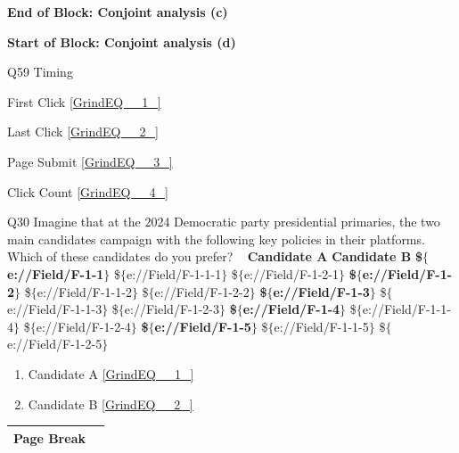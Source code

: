 \documentclass{article} %
\begin{document}
\noindent 

\noindent \textbf{End of Block: Conjoint analysis (c)}

\noindent \textbf{}

\noindent \textbf{Start of Block: Conjoint analysis (d)}

\noindent 

\noindent Q59 Timing

\noindent First Click  \eqref{GrindEQ__1_}

\noindent Last Click  \eqref{GrindEQ__2_}

\noindent Page Submit  \eqref{GrindEQ__3_}

\noindent Click Count  \eqref{GrindEQ__4_}

\noindent 

\noindent 

\noindent 

\noindent Q30 Imagine that at the 2024 Democratic party presidential primaries, the two main candidates campaign with the following key policies in their platforms. Which of these candidates do you prefer?       ~      \textbf{Candidate A}          \textbf{Candidate B}   \textbf{\$$\boldsymbol{\mathrm{\{}}$e://Field/F-1-1$\boldsymbol{\mathrm{\}}}$} \$$\mathrm{\{}$e://Field/F-1-1-1$\mathrm{\}}$ \$$\mathrm{\{}$e://Field/F-1-2-1$\mathrm{\}}$  \textbf{\$$\boldsymbol{\mathrm{\{}}$e://Field/F-1-2$\boldsymbol{\mathrm{\}}}$} \$$\mathrm{\{}$e://Field/F-1-1-2$\mathrm{\}}$ \$$\mathrm{\{}$e://Field/F-1-2-2$\mathrm{\}}$  \textbf{\$$\boldsymbol{\mathrm{\{}}$e://Field/F-1-3$\boldsymbol{\mathrm{\}}}$} \$$\mathrm{\{}$e://Field/F-1-1-3$\mathrm{\}}$ \$$\mathrm{\{}$e://Field/F-1-2-3$\mathrm{\}}$  \textbf{\$$\boldsymbol{\mathrm{\{}}$e://Field/F-1-4$\boldsymbol{\mathrm{\}}}$} \$$\mathrm{\{}$e://Field/F-1-1-4$\mathrm{\}}$ \$$\mathrm{\{}$e://Field/F-1-2-4$\mathrm{\}}$  \textbf{\$$\boldsymbol{\mathrm{\{}}$e://Field/F-1-5$\boldsymbol{\mathrm{\}}}$} \$$\mathrm{\{}$e://Field/F-1-1-5$\mathrm{\}}$ \$$\mathrm{\{}$e://Field/F-1-2-5$\mathrm{\}}$   

\begin{enumerate}
\item  Candidate A  \eqref{GrindEQ__1_} 

\item  Candidate B  \eqref{GrindEQ__2_} 
\end{enumerate}

\noindent 

\noindent 

\begin{tabular}{|p{0.6in}|p{3.8in}|} \hline 
Page Break &  \\ \hline 
\end{tabular}
\end{document}
